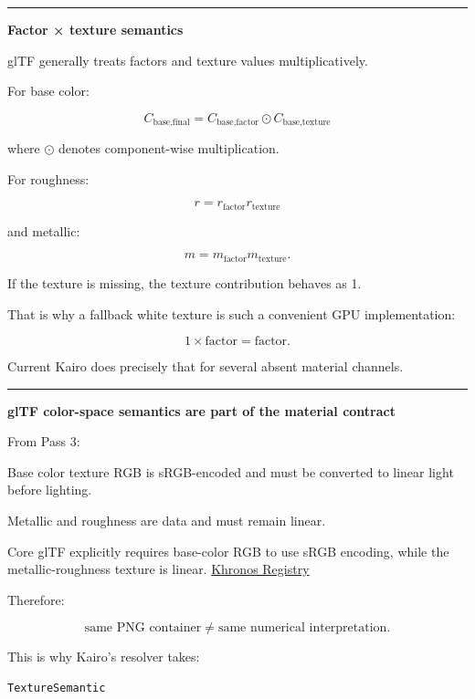 \begin{center}\rule{0.5\linewidth}{0.5pt}\end{center}

\textbf{Factor × texture semantics}

glTF generally treats factors and texture values multiplicatively.

For base color:

\[
\boxed{
C_{\text{base,final}}
=
C_{\text{base,factor}}
\odot
C_{\text{base,texture}}
}
\]

where \(\odot\) denotes component-wise multiplication.

For roughness:

\[
\boxed{
r=
r_{\text{factor}}
r_{\text{texture}}
}
\]

and metallic:

\[
\boxed{
m=
m_{\text{factor}}
m_{\text{texture}}.
}
\]

If the texture is missing, the texture contribution behaves as 1.

That is why a fallback white texture is such a convenient GPU implementation:

\[
1\times\text{factor}
=
\text{factor}.
\]

Current Kairo does precisely that for several absent material channels.

\begin{center}\rule{0.5\linewidth}{0.5pt}\end{center}

\textbf{glTF color-space semantics are part of the material contract}

From Pass 3:

Base color texture RGB is sRGB-encoded and must be converted to linear light before lighting.

Metallic and roughness are data and must remain linear.

Core glTF explicitly requires base-color RGB to use sRGB encoding, while the metallic-roughness texture is linear. \href{https://registry.khronos.org/glTF/specs/2.0/glTF-2.0.html?utm_source=chatgpt.com}{Khronos Registry}

Therefore:

\[
\boxed{
\text{same PNG container}
\neq
\text{same numerical interpretation}.
}
\]

This is why Kairo's resolver takes:

\begin{verbatim}
TextureSemantic
\end{verbatim}

